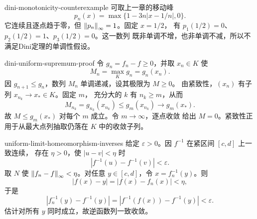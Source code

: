 \begin{solution}{dini-monotonicity-counterexample}
可取上一章的移动峰
\[
 p_n(x)=\max\{1-3n|x-1/n|,0\}.
\]
它连续且逐点趋于零，但 \(\left\lVert p_n\right\rVert_\infty=1\)。固定 \(x=1/2\)，
有 \(p_1(1/2)=0\)、\(p_2(1/2)=1\)、\(p_3(1/2)=0\)。这一数列
既非单调不增，也非单调不减，所以不满足Dini定理的单调性假设。
\end{solution}

\begin{solution}{dini-uniform-supremum-proof}
令 \(g_n=f_n-f\ge0\)，并取 \(x_n\in K\) 使
\[
 M_n=\max_Kg_n=g_n(x_n).
\]
因 \(g_{n+1}\le g_n\)，数列 \(M_n\) 单调递减，设其极限为 \(M\ge0\)。
由紧致性，\((x_n)\) 有子列 \(x_{n_k}\to x_*\in K\)。固定 \(m\)，
充分大的 \(k\) 有 \(n_k\ge m\)，从而
\[
 M_{n_k}=g_{n_k}(x_{n_k})\le g_m(x_{n_k})\to g_m(x_*).
\]
故 \(M\le g_m(x_*)\) 对每个 \(m\) 成立。令 \(m\to\infty\)，逐点收敛
给出 \(M=0\)。紧致性正用于从最大点列抽取仍落在 \(K\) 中的收敛子列。
\end{solution}

\begin{solution}{uniform-limit-homeomorphism-inverses}
给定 \(\varepsilon>0\)。因 \(f^{-1}\) 在紧区间 \([c,d]\) 上一致连续，
存在 \(\eta>0\)，使 \(|u-v|<\eta\) 时
\[
 |f^{-1}(u)-f^{-1}(v)|<\varepsilon.
\]
取 \(N\) 使 \(\left\lVert f_n-f\right\rVert_\infty<\eta\)。对任意 \(y\in[c,d]\)，令
\(x=f_n^{-1}(y)\)。则
\[
 |f(x)-y|=|f(x)-f_n(x)|<\eta,
\]
于是
\[
 |f_n^{-1}(y)-f^{-1}(y)|
 =|f^{-1}(f(x))-f^{-1}(y)|<\varepsilon.
\]
估计对所有 \(y\) 同时成立，故逆函数列一致收敛。
\end{solution}
